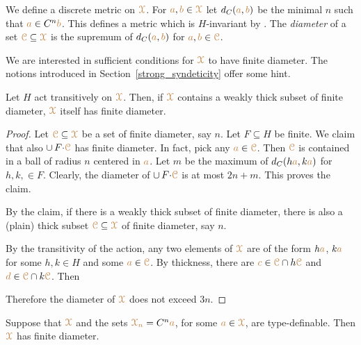 We define a discrete metric on ${\color{brown}\EuScript X}$.
For ${\color{brown} a},{\color{brown} b}\in{\color{brown}\EuScript X}$ let \emph{$d_C({\color{brown} a},{\color{brown} b})$\/} be the minimal $n$ such that ${\color{brown} a}\in C^n{\color{brown} b}$.
This defines a metric which is $H$-invariant by .
The \emph{diameter\/} of a set ${\color{brown}\EuScript C}\subseteq{\color{brown}\EuScript X}$ is the supremum of $d_C({\color{brown} a},{\color{brown} b})$ for ${\color{brown} a},{\color{brown} b}\in{\color{brown}\EuScript C}$.

We are interested in sufficient conditions for ${\color{brown}\EuScript X}$ to have finite diameter.
The notions introduced in Section~\ref{strong_syndeticity} offer some hint.

\begin{proposition}\label{prop_wpers_finite_diameter}
  Let $H$ act transitively on ${\color{brown}\EuScript X}$.
  Then, if ${\color{brown}\EuScript X}$ contains a weakly thick subset of finite diameter, ${\color{brown}\EuScript X}$ itself has finite diameter.
\end{proposition}

\begin{proof}
  Let ${\color{brown}\EuScript C}\subseteq{\color{brown}\EuScript X}$ be a set of finite diameter, say $n$.
  Let $F\subseteq H$ be finite.
  We claim that also $\cup\,F{\cdot}{\color{brown}\EuScript C}$ has finite diameter.
  In fact, pick any ${\color{brown} a}\in{\color{brown}\EuScript C}$.
  Then ${\color{brown}\EuScript C}$ is contained in a ball of radius $n$ centered in ${\color{brown} a}$. Let $m$ be the maximum of $d_C(h{\color{brown} a}, k{\color{brown} a})$ for $h,k,\in F$.
  Clearly, the diameter of $\cup\,F{\cdot}{\color{brown}\EuScript C}$ is at most $2n+m$.
  This proves the claim.

  By the claim, if there is a weakly thick subset of finite diameter, there is also a (plain) thick subset ${\color{brown}\EuScript C}\subseteq{\color{brown}\EuScript X}$ of finite diameter, say $n$.
  
  By the transitivity of the action, any two elements of ${\color{brown}\EuScript X}$ are of the form $h{\color{brown} a}$, $k{\color{brown} a}$ for some $h,k\in H$ and some ${\color{brown} a}\in{\color{brown}\EuScript C}$.
  By thickness, there are ${\color{brown} c}\in{\color{brown}\EuScript C}\cap h{\color{brown}\EuScript C}$ and ${\color{brown} d}\in{\color{brown}\EuScript C}\cap k{\color{brown}\EuScript C}$.
  Then 



  Therefore the diameter of ${\color{brown}\EuScript X}$ does not exceed $3n$.
\end{proof}

\begin{theorem}\label{thm_newelski}
  Suppose that ${\color{brown}\EuScript X}$ and the sets ${\color{brown}\EuScript X_n}=C^n{\color{brown} a}$, for some ${\color{brown} a}\in{\color{brown}\EuScript X}$, are type-definable.
  Then ${\color{brown}\EuScript X}$ has finite diameter.
\end{theorem}


